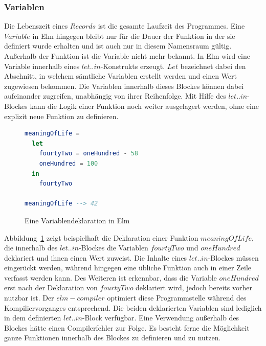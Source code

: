 \subsubsection{Variablen}
\label{sec:Variablen}
Die Lebenszeit eines $Records$ ist die gesamte Laufzeit des Programmes. Eine $Variable$ in Elm hingegen bleibt nur für die Dauer der Funktion in der sie definiert wurde erhalten und ist auch nur in diesem Namensraum gültig. Außerhalb der Funktion ist die Variable nicht mehr bekannt. In Elm wird eine Variable innerhalb eines $let..in$-Konstrukts erzeugt. $Let$ bezeichnet dabei den Abschnitt, in welchem sämtliche Variablen erstellt werden und einen Wert zugewiesen bekommen. Die Variablen innerhalb dieses Blockes können dabei aufeinander zugreifen, unabhängig von ihrer Reihenfolge. Mit Hilfe des $let..in$-Blockes kann die Logik einer Funktion noch weiter ausgelagert werden, ohne eine explizit neue Funktion zu definieren.
\begin{figure}[h]
\begin{lstlisting}[language=Elm]
meaningOfLife =
  let
    fourtyTwo = oneHundred - 58
    oneHundred = 100
  in
    fourtyTwo

meaningOfLife --> 42
\end{lstlisting}
\caption{Eine Variablendeklaration in Elm}\label{fig:elm-variables}
\end{figure}
Abbildung~\ref{fig:elm-variables} zeigt beispielhaft die Deklaration einer Funktion $meaningOfLife$, die innerhalb des $let..in$-Blockes die Variablen $fourtyTwo$ und $oneHundred$ deklariert und ihnen einen Wert zuweist. Die Inhalte eines $let..in$-Blockes müssen eingerückt werden, während hingegen eine übliche Funktion auch in einer Zeile verfasst werden kann. Des Weiteren ist erkennbar, dass die Variable $oneHundred$ erst nach der Deklaration von $fourtyTwo$ deklariert wird, jedoch bereits vorher nutzbar ist. Der $elm-compiler$ optimiert diese Programmstelle während des Kompiliervorganges entsprechend. Die beiden deklarierten Variablen sind lediglich in dem definierten $let..in$-Block verfügbar. Eine Verwendung außerhalb des Blockes hätte einen Compilerfehler zur Folge. Es besteht ferne die Möglichkeit ganze Funktionen innerhalb des Blockes zu definieren und zu nutzen.

